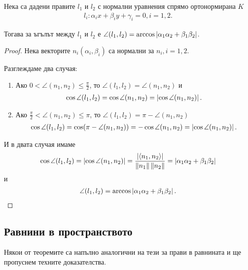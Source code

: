 \documentclass[numbers=endperiod, bibliography=totocnumbered]{scrartcl}
\begin{document}
\begin{theorem}
  Нека са дадени правите \( l_1 \) и \( l_2 \) с нормални уравнения спрямо ортонормирана \( K \)
  \begin{align*}
    l_i: \alpha_i x + \beta_i y + \gamma_i = 0, i = 1, 2.
  \end{align*}

  Тогава за ъгълът между \( l_1 \) и \( l_2 \) е \( \angle(l_1, l_2) = \arccos \left\vert \alpha_1 \alpha_2 + \beta_1 \beta_2 \right\vert \).
\end{theorem}
\begin{proof}
  Нека векторите \( n_i(\alpha_i, \beta_i) \) са нормални за \( n_i, i = 1, 2 \).

  Разглеждаме два случая:
  \begin{enumerate}
    \item Ако \( 0 < \angle(n_1, n_2) \leq \frac {\pi} 2 \), то \( \angle(l_1, l_2) = \angle(n_1, n_2) \) и
    \begin{align*}
      \cos \angle (l_1, l_2)
      =
      \cos \angle(n_1, n_2)
      =
      \left\vert \cos \angle (n_1, n_2) \right\vert.
    \end{align*}

    \item Ако \( \frac {\pi} 2 < \angle(n_1, n_2) \leq \pi \), то \( \angle(l_1, l_2) = \pi - \angle(n_1, n_2) \)
    \begin{align*}
      \cos \angle (l_1, l_2)
      =
      \cos (\pi - \angle(n_1, n_2))
      =
      -\cos \angle(n_1, n_2)
      =
      \left\vert \cos \angle (n_1, n_2) \right\vert.
    \end{align*}
  \end{enumerate}

  И в двата случая имаме
  \begin{align*}
    \cos \angle(l_1, l_2)
    =
    \left\vert \cos \angle(n_1, n_2) \right\vert
    =
    \frac {\left\vert \left\langle n_1, n_2 \right\rangle \right\vert} {\left\Vert n_1 \right\Vert \left\Vert n_2 \right\Vert}
    =
    \left\vert \alpha_1 \alpha_2 + \beta_1 \beta_2 \right\vert
  \end{align*}
  и
  \begin{align*}
    \angle(l_1, l_2)
    =
    \arccos \left\vert \alpha_1 \alpha_2 + \beta_1 \beta_2 \right\vert.
  \end{align*}
\end{proof}

\subsection{Равнини в пространството}

\begin{note}
  Някои от теоремите са напълно аналогични на тези за прави в равнината и ще пропуснем техните доказателства.
\end{note}
\end{document}
